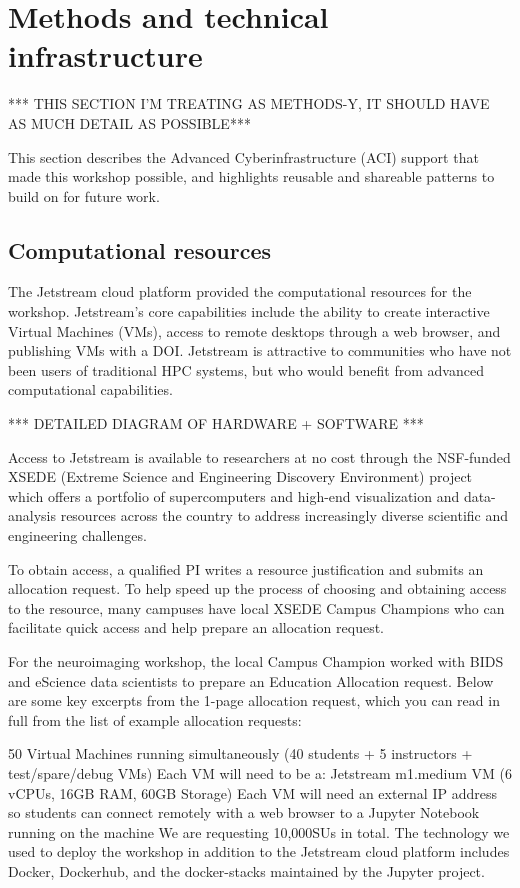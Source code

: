 \section{Methods and technical infrastructure}

*** THIS SECTION I'M TREATING AS METHODS-Y, IT SHOULD HAVE AS MUCH DETAIL AS POSSIBLE***


This section describes the Advanced Cyberinfrastructure (ACI) support that made this workshop possible, and highlights reusable and shareable patterns to build on for future work.

\subsection{Computational resources}

The Jetstream cloud platform provided the computational resources for the
workshop. Jetstream’s core capabilities include the ability to create
interactive Virtual Machines (VMs), access to remote desktops through a web
browser, and publishing VMs with a DOI. Jetstream is attractive to communities
who have not been users of traditional HPC systems, but who would benefit from
advanced computational capabilities.

*** DETAILED DIAGRAM OF HARDWARE + SOFTWARE ***

Access to Jetstream is available to researchers at no cost through the
NSF-funded XSEDE (Extreme Science and Engineering Discovery Environment) project
which offers a portfolio of supercomputers and high-end visualization and
data-analysis resources across the country to address increasingly diverse
scientific and engineering challenges.

To obtain access, a qualified PI writes a resource justification and submits an
allocation request. To help speed up the process of choosing and obtaining
access to the resource, many campuses have local XSEDE Campus Champions who can
facilitate quick access and help prepare an allocation request.

For the neuroimaging workshop, the local Campus Champion worked with BIDS and
eScience data scientists to prepare an Education Allocation request. Below are
some key excerpts from the 1-page allocation request, which you can read in full
from the list of example allocation requests:

50 Virtual Machines running simultaneously (40 students + 5 instructors +
test/spare/debug VMs) Each VM will need to be a: Jetstream m1.medium VM (6
vCPUs, 16GB RAM, 60GB Storage) Each VM will need an external IP address so
students can connect remotely with a web browser to a Jupyter Notebook running
on the machine We are requesting 10,000SUs in total. The technology we used to
deploy the workshop in addition to the Jetstream cloud platform includes Docker,
Dockerhub, and the docker-stacks maintained by the Jupyter project.

